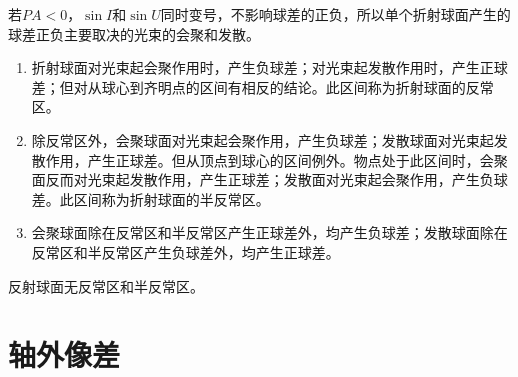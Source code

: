 \begin{table}[htbp]
	\centering
	\caption{$r<0$的球面在各区间内的球差正负}
	\label{tab:spherical-aberration-of-sphere-in-each-interval-2}
\end{table}

若$PA<0$，$\sin I$和$\sin U$同时变号，不影响球差的正负，所以单个折射球面产生的球差正负主要取决的光束的会聚和发散。

\begin{conclusion}
\begin{enumerate}
	\item 折射球面对光束起会聚作用时，产生负球差；对光束起发散作用时，产生正球差；但对从球心到齐明点的区间有相反的结论。此区间称为折射球面的反常区。
	\item 除反常区外，会聚球面对光束起会聚作用，产生负球差；发散球面对光束起发散作用，产生正球差。但从顶点到球心的区间例外。物点处于此区间时，会聚面反而对光束起发散作用，产生正球差；发散面对光束起会聚作用，产生负球差。此区间称为折射球面的半反常区。
	\item 会聚球面除在反常区和半反常区产生正球差外，均产生负球差；发散球面除在反常区和半反常区产生负球差外，均产生正球差。
\end{enumerate}
\end{conclusion}
\begin{note}
反射球面无反常区和半反常区。
\end{note}

\section{轴外像差}


